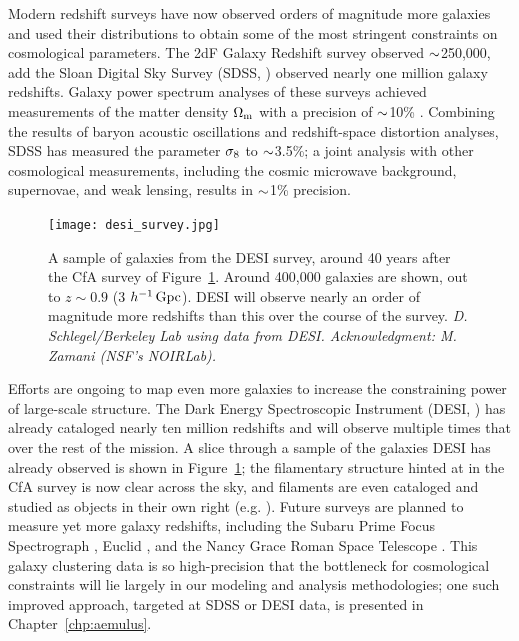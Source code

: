 Modern redshift surveys have now observed orders of magnitude more galaxies and used their distributions to obtain some of the most stringent constraints on cosmological parameters.
The 2dF Galaxy Redshift survey \citep{Colless2001} observed $\mathord{\sim}$250,000, add the Sloan Digital Sky Survey (SDSS, \citealt{York2000}) observed nearly one million galaxy redshifts.
Galaxy power spectrum analyses of these surveys achieved measurements of the matter density ${\Omega_\mathrm{m}}$ with a precision of $\mathord{\sim}$10\% \citep{cole_2df_2005, tegmark_cosmological_2006}.
Combining the results of baryon acoustic oscillations and redshift-space distortion analyses, SDSS has measured the parameter $\sigma_\mathrm{8}$ to $\mathord{\sim}$3.5\%; a joint analysis with other cosmological measurements, including the cosmic microwave background, supernovae, and weak lensing, results in $\mathord{\sim}$1\% precision.

\begin{figure}
    \centering
    \texttt{[image: desi\_survey.jpg]}
    \caption{A sample of galaxies from the DESI survey, around 40 years after the CfA survey of Figure~\ref{fig:desi_survey}. Around 400,000 galaxies are shown, out to $z \sim 0.9$ (3 $h^{-1}\,\mathrm{Gpc}$). DESI will observe nearly an order of magnitude more redshifts than this over the course of the survey. \emph{D. Schlegel/Berkeley Lab using data from DESI. Acknowledgment: M. Zamani (NSF's NOIRLab).}}
    \label{fig:desi_survey}
\end{figure}

Efforts are ongoing to map even more galaxies to increase the constraining power of large-scale structure.
The Dark Energy Spectroscopic Instrument (DESI, \citealt{Aghamousa2016}) has already cataloged nearly ten million redshifts and will observe multiple times that over the rest of the mission.
A slice through a sample of the galaxies DESI has already observed is shown in Figure~\ref{fig:desi_survey}; the filamentary structure hinted at in the CfA survey is now clear across the sky, and filaments are even cataloged and studied as objects in their own right (e.g. \citealt{tempel_detecting_2014}).
Future surveys are planned to measure yet more galaxy redshifts, including the Subaru Prime Focus Spectrograph \citep{takada_extragalactic_2014}, Euclid \citep{Laureijs2011}, and the Nancy Grace Roman Space Telescope \citep{Green2012}.
This galaxy clustering data is so high-precision that the bottleneck for cosmological constraints will lie largely in our modeling and analysis methodologies; one such improved approach, targeted at SDSS or DESI data, is presented in Chapter~\ref{chp:aemulus}.

